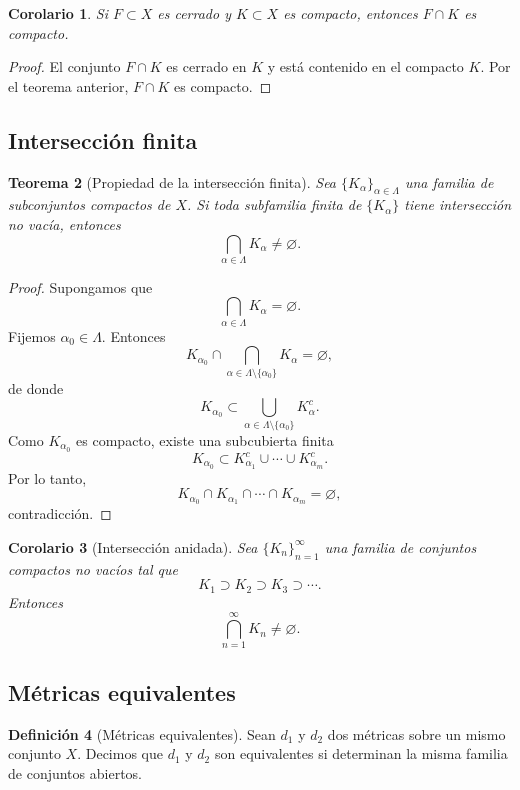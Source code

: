 \documentclass[12pt]{article}
\theoremstyle{definition}
\newtheorem{definition}{Definición}[section]
\theoremstyle{plain}
\newtheorem{theorem}[definition]{Teorema}
\newtheorem{corollary}[definition]{Corolario}
\theoremstyle{remark}
\begin{document}
\begin{corollary}
Si $F\subset X$ es cerrado y $K\subset X$ es compacto, entonces $F\cap K$ es compacto.
\end{corollary}

\begin{proof}
El conjunto $F\cap K$ es cerrado en $K$ y está contenido en el compacto $K$.
Por el teorema anterior, $F\cap K$ es compacto.
\end{proof}

\subsection*{Intersección finita}

\begin{theorem}[Propiedad de la intersección finita]
Sea $\{K_\alpha\}_{\alpha\in\Lambda}$ una familia de subconjuntos compactos de $X$.
Si toda subfamilia finita de $\{K_\alpha\}$ tiene intersección no vacía, entonces
\[
\bigcap_{\alpha\in\Lambda}K_\alpha\neq\varnothing.
\]
\end{theorem}

\begin{proof}
Supongamos que
\[
\bigcap_{\alpha\in\Lambda}K_\alpha=\varnothing.
\]
Fijemos $\alpha_0\in\Lambda$.
Entonces
\[
K_{\alpha_0}\cap\bigcap_{\alpha\in\Lambda\setminus\{\alpha_0\}}K_\alpha=\varnothing,
\]
de donde
\[
K_{\alpha_0}\subset\bigcup_{\alpha\in\Lambda\setminus\{\alpha_0\}}K_\alpha^c.
\]
Como $K_{\alpha_0}$ es compacto, existe una subcubierta finita
\[
K_{\alpha_0}\subset K_{\alpha_1}^c\cup\cdots\cup K_{\alpha_m}^c.
\]
Por lo tanto,
\[
K_{\alpha_0}\cap K_{\alpha_1}\cap\cdots\cap K_{\alpha_m}=\varnothing,
\]
contradicción.
\end{proof}

\begin{corollary}[Intersección anidada]
Sea $\{K_n\}_{n=1}^\infty$ una familia de conjuntos compactos no vacíos tal que
\[
K_1\supset K_2\supset K_3\supset\cdots.
\]
Entonces
\[
\bigcap_{n=1}^\infty K_n\neq\varnothing.
\]
\end{corollary}

\subsection*{Métricas equivalentes}

\begin{definition}[Métricas equivalentes]
Sean $d_1$ y $d_2$ dos métricas sobre un mismo conjunto $X$.
Decimos que $d_1$ y $d_2$ son equivalentes si determinan la misma familia de conjuntos abiertos.
\end{definition}
\end{document}
